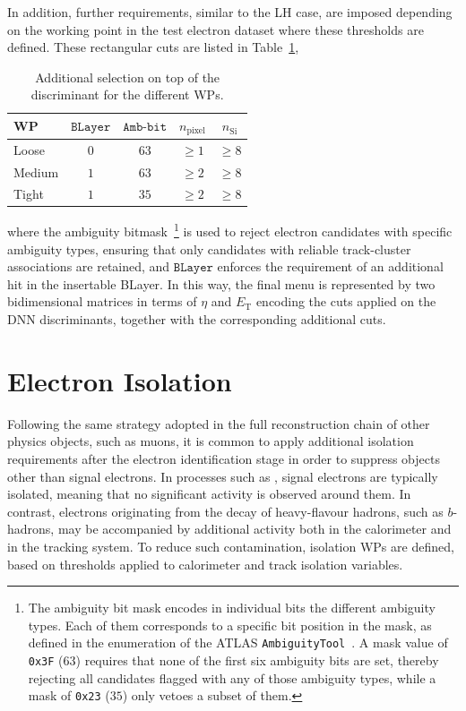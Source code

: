 In addition, further requirements, similar to the LH case, are imposed depending on the working point in the test electron dataset where these thresholds are defined. These rectangular cuts are listed in Table~\ref{tab:wp_rectangular_cuts},
\begin{table}[htbp]
  \centering
  \footnotesize
  \begin{tabular}{lcccc}
  \hline
  WP & $\texttt{BLayer}$ & $\texttt{Amb-bit}$ & $n_{\mathrm{pixel}}$ & $n_{\mathrm{Si}}$ \\
  \hline
  Loose  & 0 & $63$ & $\geq 1$ & $\geq 8$ \\
  Medium & $1$ & $63$ & $\geq 2$ & $\geq 8$ \\
  Tight  & $1$ & $35$ & $\geq 2$ & $\geq 8$ \\
  \hline
  \end{tabular}
  \caption{Additional selection on top of the discriminant for the different WPs.}
  \label{tab:wp_rectangular_cuts}
\end{table}
where the ambiguity bitmask~\footnote{The ambiguity bit mask encodes in individual bits the different ambiguity types. Each of them corresponds to a specific bit position in the mask, as defined in the enumeration of the ATLAS \texttt{AmbiguityTool}~\cite{atlas:AmbiguityTool}. A mask value of \texttt{0x3F} (\(63\)) requires that none of the first six ambiguity bits are set, thereby rejecting all candidates flagged with any of those ambiguity types, while a mask of \texttt{0x23} (\(35\)) only vetoes a subset of them.} is used to reject electron candidates with specific ambiguity types, ensuring that only candidates with reliable track-cluster associations are retained, and $\texttt{BLayer}$ enforces the requirement of an additional hit in the insertable BLayer. In this way, the final menu is represented by two bidimensional matrices in terms of $\eta$ and $E_{\text{T}}$ encoding the cuts applied on the DNN discriminants, together with the corresponding additional cuts.

\section{Electron Isolation}
\label{electron_iso}

Following the same strategy adopted in the full reconstruction chain of other physics objects, such as muons, it is common to apply additional isolation requirements after the electron identification stage in order to suppress objects other than signal electrons. In processes such as \zee, signal electrons are typically isolated, meaning that no significant activity is observed around them. In contrast, electrons originating from the decay of heavy-flavour hadrons, such as $b$-hadrons, may be accompanied by additional activity both in the calorimeter and in the tracking system. To reduce such contamination, isolation WPs are defined, based on thresholds applied to calorimeter and track isolation variables.

